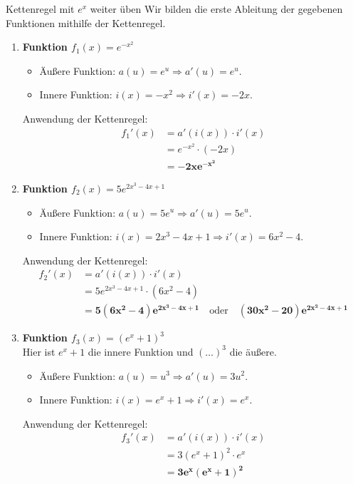 \begin{loesungsumgebung}{Kettenregel mit $e^x$ weiter üben}
Wir bilden die erste Ableitung der gegebenen Funktionen mithilfe der Kettenregel.

\begin{enumerate}[label=(\alph*)]
    \item \textbf{Funktion $f_1(x) = e^{-x^2}$}
    \begin{itemize}
        \item Äußere Funktion: $a(u) = e^u \Rightarrow a'(u) = e^u$.
        \item Innere Funktion: $i(x) = -x^2 \Rightarrow i'(x) = -2x$.
    \end{itemize}
    Anwendung der Kettenregel:
    \begin{align*}
    f_1'(x) &= a'(i(x)) \cdot i'(x) \\
            &= e^{-x^2} \cdot (-2x) \\
            &= \mathbf{-2xe^{-x^2}}
    \end{align*}

    \item \textbf{Funktion $f_2(x) = 5e^{2x^3-4x+1}$}
    \begin{itemize}
        \item Äußere Funktion: $a(u) = 5e^u \Rightarrow a'(u) = 5e^u$.
        \item Innere Funktion: $i(x) = 2x^3-4x+1 \Rightarrow i'(x) = 6x^2-4$.
    \end{itemize}
    Anwendung der Kettenregel:
    \begin{align*}
    f_2'(x) &= a'(i(x)) \cdot i'(x) \\
            &= 5e^{2x^3-4x+1} \cdot (6x^2-4) \\
            &= \mathbf{5(6x^2-4)e^{2x^3-4x+1}} \quad \text{oder} \quad \mathbf{(30x^2-20)e^{2x^3-4x+1}}
    \end{align*}

    \item \textbf{Funktion $f_3(x) = (e^x+1)^3$} \\
    Hier ist $e^x+1$ die innere Funktion und $(\dots)^3$ die äußere.
    \begin{itemize}
        \item Äußere Funktion: $a(u) = u^3 \Rightarrow a'(u) = 3u^2$.
        \item Innere Funktion: $i(x) = e^x+1 \Rightarrow i'(x) = e^x$.
    \end{itemize}
    Anwendung der Kettenregel:
    \begin{align*}
    f_3'(x) &= a'(i(x)) \cdot i'(x) \\
            &= 3(e^x+1)^2 \cdot e^x \\
            &= \mathbf{3e^x(e^x+1)^2}
    \end{align*}
\end{enumerate}

\end{loesungsumgebung}


